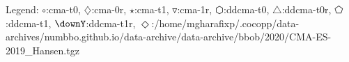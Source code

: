 Legend: {\color{NavyBlue}$\circ$}:cma-t0, {\color{Magenta}$\diamondsuit$}:cma-0r, {\color{Orange}$\star$}:cma-t1, {\color{CornflowerBlue}$\triangledown$}:cma-1r, {\color{red}$\varhexagon$}:ddcma-t0, {\color{YellowGreen}$\triangle$}:ddcma-t0r, {\color{cyan}$\pentagon$}:ddcma-t1, {\color{ForestGreen}$\downY$}:ddcma-t1r, {\color{Lavender}$\Diamond$}:/home/mgharafixp/.cocopp/data-archives/numbbo.github.io/data-archive/data-archive/bbob/2020/CMA-ES-2019\_Hansen.tgz